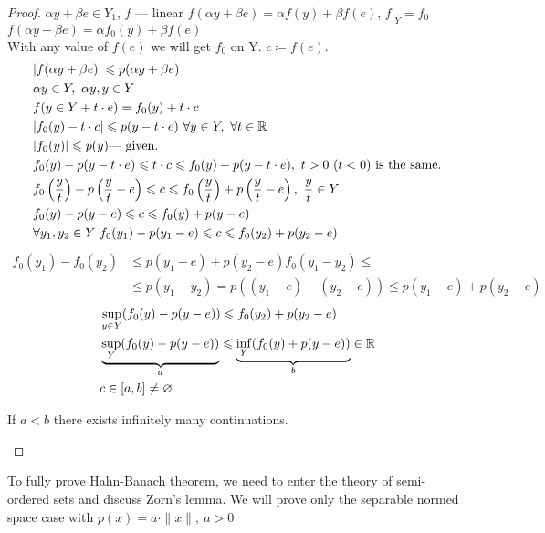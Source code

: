 \begin{proof}
  $\alpha y + \beta e \in Y_1$, $f$ --- linear $f(\alpha y + \beta e) = \alpha
  f(y) + \beta f(e)$, $f|_Y = f_0$ \\
  $f(\alpha y + \beta e) = \alpha f_0(y) + \beta f(e)$ \\
  With any value of $f(e)$ we will get $f_0$ on Y. $c \coloneqq f(e)$. 
  \begin{align*}
    &|f(\alpha y + \beta e)| \leq p(\alpha y + \beta e) \\
    &\alpha y \in Y,\ \alpha y, y \in Y \\
    &f(y \in Y + t \cdot e) = f_0(y) + t \cdot c \\
    &|f_0(y) - t \cdot c| \leq p(y - t \cdot e)\ \forall y \in Y,\ \forall t \in \R \\
    &|f_0(y)| \leq p(y) \text{--- given}. \\
    &f_0(y) - p(y - t \cdot e) \leq t \cdot c \leq f_0(y) + p(y - t \cdot e),\ t >
      0\ (t < 0) \text{ is the same}. \\
    &f_0\left(\frac{y}{t}\right) - p\left(\dfrac{y}{t} - e\right) \leq c \leq f_0\left(\dfrac{y}{t}\right) +
      p\left(\frac{y}{t} - e\right),\ \dfrac{y}{t} \in Y \\
    &f_0(y) - p(y - e) \leq c \leq f_0(y) + p(y - e) \\
    &\forall y_1, y_2 \in Y\ f_0(y_1) - p(y_1 - e) \leq c \leq f_0(y_2) + p(y_2 -
      e)
  \end{align*}
  \begin{align*}
    f_0(y_1) - f_0(y_2) &\leq p(y_1 - e) + p(y_2 - e) f_0(y_1 - y_2) \leq \\ 
                        &\leq p(y_1 - y_2) = p((y_1 - e) - (y_2 - e)) \leq p(y_1 - e) + p(y_2 - e)
  \end{align*}
  \begin{align*}
    &\sup\limits_{y \in Y}(f_0(y) - p(y - e)) \leqslant f_0(y_2) + p(y_2 - e) \\
    &\underbrace{\sup\limits_Y (f_0(y) - p(y - e))}_{a} \leqslant \underbrace{\inf\limits_Y (f_0(y) + p(y - e))}_{b}
      \in \mathbb{R} \\
    &c \in [a, b] \neq \varnothing \qedhere
  \end{align*}
  \begin{note}
    If $a < b$ there exists infinitely many continuations.
  \end{note}
\end{proof}

To fully prove Hahn-Banach theorem, we need to enter the theory of semi-ordered
sets and discuss Zorn's lemma. We will prove only the separable normed space case with
$p(x) = a \cdot \|x\|,\ a > 0$ 

